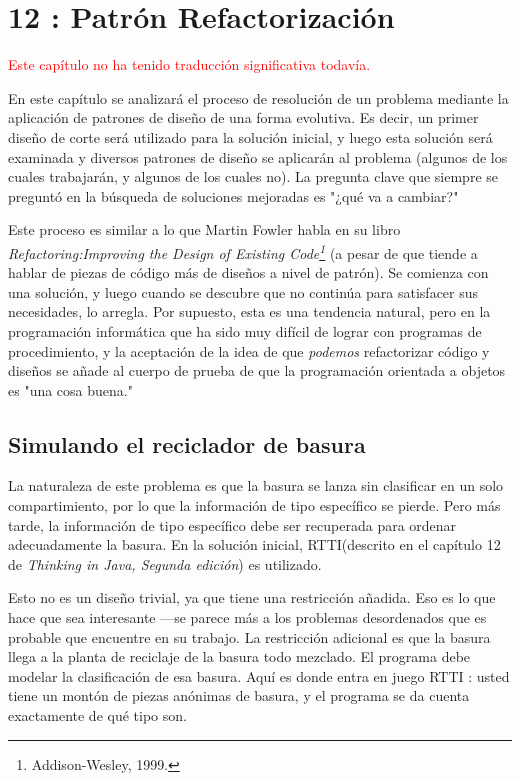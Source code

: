 \documentclass{article}
\begin{document}
\newpage

\section{12 : Patrón Refactorización}

\textcolor{red}{Este capítulo no ha tenido traducción significativa todavía.}    \newline%

En este capítulo se analizará el proceso de resolución de un problema mediante la aplicación de patrones de diseño de una forma evolutiva. Es decir, un primer diseño de corte será utilizado para la solución inicial, y luego esta solución será examinada y diversos patrones de diseño se aplicarán al problema (algunos de los cuales trabajarán, y algunos de los cuales no). La pregunta clave que siempre se preguntó en la búsqueda de soluciones mejoradas es "¿qué va a cambiar?"     \newline

Este proceso es similar a lo que Martin Fowler habla en su libro \textit{Refactoring:Improving the Design of Existing Code\footnote{Addison-Wesley, 1999.}} (a pesar de que tiende a hablar de piezas de código más de diseños a nivel de patrón). Se comienza con una solución, y luego cuando se descubre que no continúa para satisfacer sus necesidades, lo arregla. Por supuesto, esta es una tendencia natural, pero en la programación informática que ha sido muy difícil de lograr con programas de procedimiento, y la aceptación de la idea de que \textit{podemos} refactorizar código y diseños se añade al cuerpo de prueba de que la programación orientada a objetos es "una cosa buena."   \newline

\subsection{Simulando el reciclador de basura}

La naturaleza de este problema es que la basura se lanza sin clasificar en un solo compartimiento, por lo que la información de tipo específico se pierde. Pero más tarde, la información de tipo específico debe ser recuperada para ordenar adecuadamente la basura. En la solución inicial, RTTI(descrito en el capítulo 12 de \textit{Thinking in Java, Segunda edición}) es utilizado.    \newline

Esto no es un diseño trivial, ya que tiene una restricción añadida. Eso es lo que hace que sea interesante —se parece más a los problemas desordenados que es probable que encuentre en su trabajo. La restricción adicional es que la basura llega a la planta de reciclaje de la basura todo mezclado. El programa debe modelar la clasificación de esa basura. Aquí es donde entra en juego RTTI : usted tiene un montón de piezas anónimas de basura, y el programa se da cuenta exactamente de qué tipo son.  \newline
\end{document}
